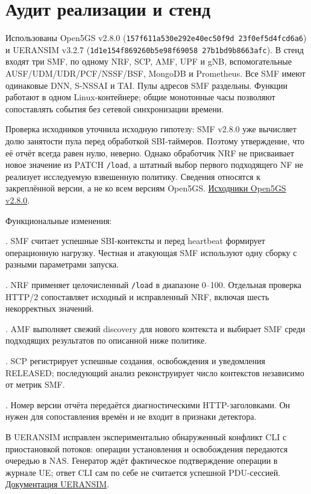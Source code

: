 \documentclass[11pt,a4paper]{article}
\begin{document}
\section*{Аудит реализации и стенд}

Использованы Open5GS v2.8.0 (\texttt{157f611a530e292e40ec50f9d 23f0ef5d4fcd6a6}) и UERANSIM v3.2.7 (\texttt{1d1e154f869260b5e98f69058 27b1bd9b8663afc}). В стенд входят три SMF, по одному NRF, SCP, AMF, UPF и gNB, вспомогательные AUSF/UDM/UDR/PCF/NSSF/BSF, MongoDB и Prometheus. Все SMF имеют одинаковые DNN, S-NSSAI и TAI. Пулы адресов SMF раздельны. Функции работают в одном Linux-контейнере; общие монотонные часы позволяют сопоставлять события без сетевой синхронизации времени.

Проверка исходников уточнила исходную гипотезу: SMF v2.8.0 уже вычисляет долю занятости пула перед обработкой SBI-таймеров. Поэтому утверждение, что её отчёт всегда равен нулю, неверно. Однако обработчик NRF не присваивает новое значение из PATCH \texttt{/load}, а штатный выбор первого подходящего NF не реализует исследуемую взвешенную политику. Сведения относятся к закреплённой версии, а не ко всем версиям Open5GS. \href{https://github.com/open5gs/open5gs/tree/v2.8.0}{Исходники Open5GS v2.8.0}.

Функциональные изменения:

. SMF считает успешные SBI-контексты и перед heartbeat формирует операционную нагрузку. Честная и атакующая SMF используют одну сборку с разными параметрами запуска.\par
{}. NRF применяет целочисленный \texttt{/load} в диапазоне 0–100. Отдельная проверка HTTP/2 сопоставляет исходный и исправленный NRF, включая шесть некорректных значений.\par
{}. AMF выполняет свежий discovery для нового контекста и выбирает SMF среди подходящих результатов по описанной ниже политике.\par
{}. SCP регистрирует успешные создания, освобождения и уведомления RELEASED; последующий анализ реконструирует число контекстов независимо от метрик SMF.\par
{}. Номер версии отчёта передаётся диагностическими HTTP-заголовками. Он нужен для сопоставления времён и не входит в признаки детектора.\par

В UERANSIM исправлен экспериментально обнаруженный конфликт CLI с приостановкой потоков: операции установления и освобождения передаются очередью в NAS. Генератор ждёт фактическое подтверждение операции в журнале UE; ответ CLI сам по себе не считается успешной PDU-сессией. \href{https://github.com/aligungr/UERANSIM/wiki/Usage}{Документация UERANSIM}.
\end{document}
